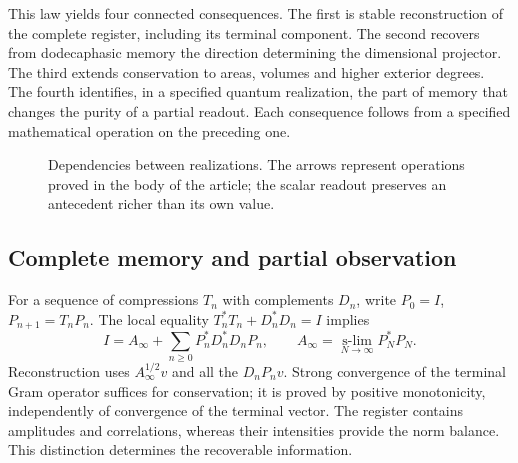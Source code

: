 This law yields four connected consequences. The first is stable reconstruction of the complete register, including its terminal component. The second recovers from dodecaphasic memory the direction determining the dimensional projector. The third extends conservation to areas, volumes and higher exterior degrees. The fourth identifies, in a specified quantum realization, the part of memory that changes the purity of a partial readout. Each consequence follows from a specified mathematical operation on the preceding one.

\begin{figure}[htbp]
\centering
{}
\caption{Dependencies between realizations. The arrows represent operations proved in the body of the article; the scalar readout preserves an antecedent richer than its own value.}
\end{figure}

\subsection{Complete memory and partial observation}
For a sequence of compressions \(T_n\) with complements \(D_n\), write
\(P_0=I\), \(P_{n+1}=T_nP_n\). The local equality
\(T_n^*T_n+D_n^*D_n=I\) implies
\[
I=A_\infty+\sum_{n\ge0}P_n^*D_n^*D_nP_n,
\qquad
A_\infty=\underset{N\to\infty}{\operatorname{s-lim}}P_N^*P_N.
\]
Reconstruction uses \(A_\infty^{1/2}v\) and all the \(D_nP_nv\). Strong convergence of the terminal Gram operator suffices for conservation; it is proved by positive monotonicity, independently of convergence of the terminal vector. The register contains amplitudes and correlations, whereas their intensities provide the norm balance. This distinction determines the recoverable information.

